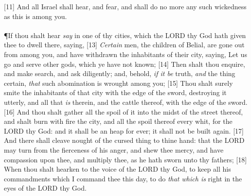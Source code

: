 [11] \textcolor[rgb]{0.00,0.00,1.00}{And all Israel shall hear, and fear, and shall do no more any such wickedness as this is among you.}\\
\\
\P \textcolor[rgb]{0.00,0.00,1.00}{If thou shalt hear \emph{say} in one of thy cities, which the LORD thy God hath given thee to dwell there, saying,}
[13] \textcolor[rgb]{0.00,0.00,1.00}{\emph{Certain} men, the children of Belial, are gone out from among you, and have withdrawn the inhabitants of their city, saying, Let us go and serve other gods, which ye have not known;}
[14] \textcolor[rgb]{0.00,0.00,1.00}{Then shalt thou enquire, and make search, and ask diligently; and, behold, \emph{if it be} truth, \emph{and} the thing certain, \emph{that} such abomination is wrought among you;}
[15] \textcolor[rgb]{0.00,0.00,1.00}{Thou shalt surely smite the inhabitants of that city with the edge of the sword, destroying it utterly, and all that \emph{is} therein, and the cattle thereof, with the edge of the sword.}
[16] \textcolor[rgb]{0.00,0.00,1.00}{And thou shalt gather all the spoil of it into the midst of the street thereof, and shalt burn with fire the city, and all the spoil thereof every whit, for the LORD thy God: and it shall be an heap for ever; it shall not be built again.}
[17] \textcolor[rgb]{0.00,0.00,1.00}{And there shall cleave nought of the cursed thing to thine hand: that the LORD may turn from the fierceness of his anger, and shew thee mercy, and have compassion upon thee, and multiply thee, as he hath sworn unto thy fathers;}
[18] \textcolor[rgb]{0.00,0.00,1.00}{When thou shalt hearken to the voice of the LORD thy God, to keep all his commandments which I command thee this day, to do \emph{that which is} right in the eyes of the LORD thy God.}
\newpage
